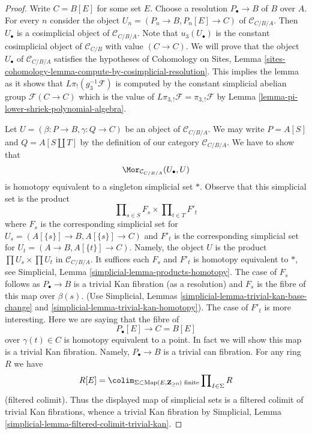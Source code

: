 \begin{proof}
Write $C = B[E]$ for some set $E$. Choose a resolution
$P_\bullet \to B$ of $B$ over $A$. For every $n$ consider
the object $U_n = (P_n \to B, P_n[E] \to C)$ of $\mathcal{C}_{C/B/A}$.
Then $U_\bullet$ is a cosimplicial object of $\mathcal{C}_{C/B/A}$.
Note that $u_3(U_\bullet)$ is the constant cosimplicial
object of $\mathcal{C}_{C/B}$ with value $(C \to C)$.
We will prove that the object $U_\bullet$ of $\mathcal{C}_{C/B/A}$
satisfies the hypotheses of
Cohomology on Sites, Lemma
\ref{sites-cohomology-lemma-compute-by-cosimplicial-resolution}.
This implies the lemma as it shows that $L\pi_!(g_3^{-1}\mathcal{F})$
is computed by the constant simplicial abelian group
$\mathcal{F}(C \to C)$ which is the value of
$L\pi_{3, !}\mathcal{F} = \pi_{3, !}\mathcal{F}$ by
Lemma \ref{lemma-pi-lower-shriek-polynomial-algebra}.

\medskip\noindent
Let $U = (\beta : P \to B, \gamma : Q \to C)$ be an object of
$\mathcal{C}_{C/B/A}$. We may write $P = A[S]$ and $Q = A[S \amalg T]$
by the definition of our category $\mathcal{C}_{C/B/A}$. We have to show that
$$
\Mor_{\mathcal{C}_{C/B/A}}(U_\bullet, U)
$$
is homotopy equivalent to a singleton simplicial set $*$. Observe that this
simplicial set is the product
$$
\prod\nolimits_{s \in S} F_s \times \prod\nolimits_{t \in T} F'_t
$$
where $F_s$ is the corresponding simplicial set for
$U_s = (A[\{s\}] \to B, A[\{s\}] \to C)$
and $F'_t$ is the corresponding simplicial set for
$U_t = (A \to B, A[\{t\}] \to C)$. Namely, the object $U$
is the product $\prod U_s \times \prod U_t$ in $\mathcal{C}_{C/B/A}$.
It suffices each $F_s$ and $F'_t$ is homotopy equivalent to $*$, see
Simplicial, Lemma \ref{simplicial-lemma-products-homotopy}.
The case of $F_s$ follows as $P_\bullet \to B$ is a trivial Kan
fibration (as a resolution) and $F_s$ is the fibre of this map over
$\beta(s)$. (Use Simplicial, Lemmas
\ref{simplicial-lemma-trivial-kan-base-change} and
\ref{simplicial-lemma-trivial-kan-homotopy}).
The case of $F'_t$ is more interesting. Here we are saying that
the fibre of
$$
P_\bullet[E] \longrightarrow C = B[E]
$$
over $\gamma(t) \in C$ is homotopy equivalent to a point. In fact we
will show this map is a trivial Kan fibration. Namely,
$P_\bullet \to B$ is a trivial can fibration. For any ring $R$
we have
$$
R[E] =
\colim_{\Sigma \subset \text{Map}(E, \mathbf{Z}_{\geq 0})\text{ finite}}
\prod\nolimits_{I \in \Sigma} R
$$
(filtered colimit). Thus the displayed map of simplicial sets is a
filtered colimit of trivial Kan fibrations, whence a trivial Kan fibration
by Simplicial, Lemma \ref{simplicial-lemma-filtered-colimit-trivial-kan}.
\end{proof}

